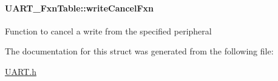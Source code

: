 \paragraph[{write\-Cancel\-Fxn}]{ U\-A\-R\-T\-\_\-\-Fxn\-Table\-::write\-Cancel\-Fxn}\label{struct_u_a_r_t___fxn_table_a5eb722a7231589656f26cb1e8b06095e}
Function to cancel a write from the specified peripheral 

The documentation for this struct was generated from the following file\-:\begin{DoxyCompactItemize}
\item 
\hyperlink{_u_a_r_t_8h}{U\-A\-R\-T.\-h}\end{DoxyCompactItemize}
